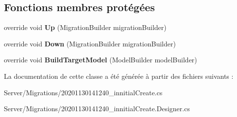 \subsection*{Fonctions membres protégées}
\begin{DoxyCompactItemize}
\item 
\mbox{\label{class_mediwatch_1_1_server_1_1_migrations_1_1innitial_create_ae036630989af2c2f41f0b2257d35a8e0}} 
override void {\bfseries Up} (Migration\+Builder migration\+Builder)
\item 
\mbox{\label{class_mediwatch_1_1_server_1_1_migrations_1_1innitial_create_a8a02e197d3bd2cc0eefc6ac7814d1372}} 
override void {\bfseries Down} (Migration\+Builder migration\+Builder)
\item 
\mbox{\label{class_mediwatch_1_1_server_1_1_migrations_1_1innitial_create_ad7cc9104c9bb7f0274826a71631b8851}} 
override void {\bfseries Build\+Target\+Model} (Model\+Builder model\+Builder)
\end{DoxyCompactItemize}


La documentation de cette classe a été générée à partir des fichiers suivants \+:\begin{DoxyCompactItemize}
\item 
Server/\+Migrations/20201130141240\+\_\+innitial\+Create.\+cs\item 
Server/\+Migrations/20201130141240\+\_\+innitial\+Create.\+Designer.\+cs\end{DoxyCompactItemize}
